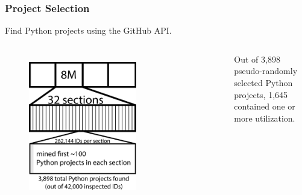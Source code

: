 

\begin{frame}
\frametitle{Project Selection}
\begin{center}
Find Python projects using the GitHub API.
\end{center}
\begin{columns}[t]
\begin{figure}[ht]
  \includegraphics[scale=0.16]{nontex/illustrations/32Divided.eps}
  \label{fig:32Divided}
\end{figure}
\begin{figure}[ht]
    \label{fig:scraper}
\end{figure}
Out of 3,898 pseudo-randomly selected Python projects, 1,645 contained one or more utilization.
\end{columns}
\end{frame}

